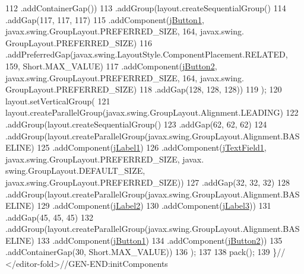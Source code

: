 \begin{DoxyCode}
112                 .addContainerGap())
113             .addGroup(layout.createSequentialGroup()
114                 .addGap(117, 117, 117)
115                 .addComponent(\mbox{\hyperlink{class_ejercicio2_1_1_buffer_interfaz_a1ec51a96e127bf42cda327fbfeb2a518}{jButton1}}, javax.swing.GroupLayout.PREFERRED\_SIZE, 164, javax.swing.
      GroupLayout.PREFERRED\_SIZE)
116                 .addPreferredGap(javax.swing.LayoutStyle.ComponentPlacement.RELATED, 159, Short.MAX\_VALUE)
117                 .addComponent(\mbox{\hyperlink{class_ejercicio2_1_1_buffer_interfaz_a0c2d3a8ae39447836ea6faf16fb98ec3}{jButton2}}, javax.swing.GroupLayout.PREFERRED\_SIZE, 164, javax.swing.
      GroupLayout.PREFERRED\_SIZE)
118                 .addGap(128, 128, 128))
119         );
120         layout.setVerticalGroup(
121             layout.createParallelGroup(javax.swing.GroupLayout.Alignment.LEADING)
122             .addGroup(layout.createSequentialGroup()
123                 .addGap(62, 62, 62)
124                 .addGroup(layout.createParallelGroup(javax.swing.GroupLayout.Alignment.BASELINE)
125                     .addComponent(\mbox{\hyperlink{class_ejercicio2_1_1_buffer_interfaz_adc7aca7314d0fe3c8cbe793a812d21b2}{jLabel1}})
126                     .addComponent(\mbox{\hyperlink{class_ejercicio2_1_1_buffer_interfaz_a2cfe0e22bb31e597087955036f69b34a}{jTextField1}}, javax.swing.GroupLayout.PREFERRED\_SIZE, javax.
      swing.GroupLayout.DEFAULT\_SIZE, javax.swing.GroupLayout.PREFERRED\_SIZE))
127                 .addGap(32, 32, 32)
128                 .addGroup(layout.createParallelGroup(javax.swing.GroupLayout.Alignment.BASELINE)
129                     .addComponent(\mbox{\hyperlink{class_ejercicio2_1_1_buffer_interfaz_ac8adb3eda942e75c690374fafc43eee2}{jLabel2}})
130                     .addComponent(\mbox{\hyperlink{class_ejercicio2_1_1_buffer_interfaz_ab11594779db262d4fc72c8c1515b7fd9}{jLabel3}}))
131                 .addGap(45, 45, 45)
132                 .addGroup(layout.createParallelGroup(javax.swing.GroupLayout.Alignment.BASELINE)
133                     .addComponent(\mbox{\hyperlink{class_ejercicio2_1_1_buffer_interfaz_a1ec51a96e127bf42cda327fbfeb2a518}{jButton1}})
134                     .addComponent(\mbox{\hyperlink{class_ejercicio2_1_1_buffer_interfaz_a0c2d3a8ae39447836ea6faf16fb98ec3}{jButton2}}))
135                 .addContainerGap(30, Short.MAX\_VALUE))
136         );
137 
138         pack();
139     \}\textcolor{comment}{// </editor-fold>//GEN-END:initComponents}
\end{DoxyCode}
\mbox{\label{class_ejercicio2_1_1_buffer_interfaz_a79e9c5884d7a271f4ea91c1807f846da}} 
